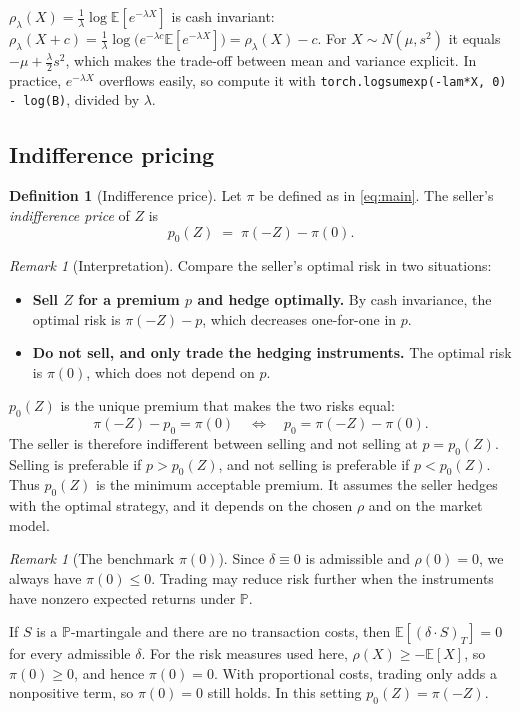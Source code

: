 \documentclass[11pt]{article}
\theoremstyle{definition}
\newtheorem{definition}[theorem]{Definition}
\theoremstyle{remark}
\newtheorem{remark}[theorem]{Remark}
\newcommand{\E}{\mathbb{E}}
\begin{document}
$\rho_\lambda(X)=\frac1\lambda\log\E[e^{-\lambda X}]$ is cash invariant:
$\rho_\lambda(X+c)=\frac1\lambda\log\bigl(e^{-\lambda c}\E[e^{-\lambda X}]\bigr)=\rho_\lambda(X)-c$.
For $X\sim N(\mu,s^2)$ it equals $-\mu+\tfrac{\lambda}{2}s^2$, which makes the trade-off between
mean and variance explicit. In practice, $e^{-\lambda X}$ overflows easily, so compute it with
\texttt{torch.logsumexp(-lam*X, 0) - log(B)}, divided by $\lambda$.

\subsection{Indifference pricing}

\begin{definition}[Indifference price]
Let $\pi$ be defined as in \eqref{eq:main}. The seller's \emph{indifference price} of $Z$ is
\[
p_0(Z) \;=\; \pi(-Z) - \pi(0).
\]
\end{definition}

\begin{remark}[Interpretation]
Compare the seller's optimal risk in two situations:
\begin{itemize}
  \item \textbf{Sell $Z$ for a premium $p$ and hedge optimally.} By cash invariance, the optimal risk is $\pi(-Z) - p$, which decreases one-for-one in $p$.
  \item \textbf{Do not sell, and only trade the hedging instruments.} The optimal risk is $\pi(0)$, which does not depend on $p$.
\end{itemize}
$p_0(Z)$ is the unique premium that makes the two risks equal:
\[
\pi(-Z) - p_0 = \pi(0) \quad\Longleftrightarrow\quad p_0 = \pi(-Z) - \pi(0).
\]
The seller is therefore indifferent between selling and not selling at $p = p_0(Z)$. Selling is preferable if $p > p_0(Z)$, and not selling is preferable if $p < p_0(Z)$. Thus $p_0(Z)$ is the minimum acceptable premium. It assumes the seller hedges with the optimal strategy, and it depends on the chosen $\rho$ and on the market model.
\end{remark}

\begin{remark}[The benchmark $\pi(0)$]
Since $\delta \equiv 0$ is admissible and $\rho(0) = 0$, we always have $\pi(0) \le 0$. Trading may reduce risk further when the instruments have nonzero expected returns under $\mathbb P$.

If $S$ is a $\mathbb P$-martingale and there are no transaction costs, then $\mathbb E[(\delta\cdot S)_T] = 0$ for every admissible $\delta$. For the risk measures used here, $\rho(X) \ge -\mathbb E[X]$, so $\pi(0) \ge 0$, and hence $\pi(0) = 0$. With proportional costs, trading only adds a nonpositive term, so $\pi(0) = 0$ still holds. In this setting $p_0(Z) = \pi(-Z)$.
\end{remark}
\end{document}
